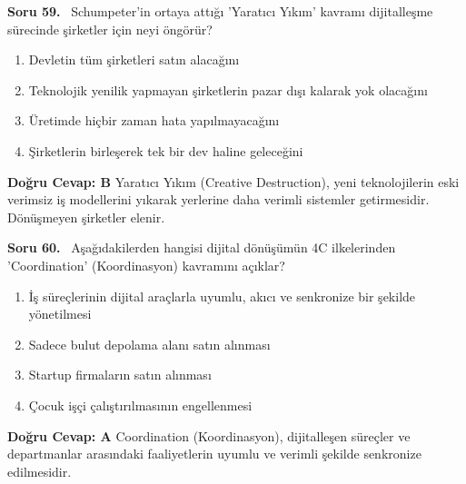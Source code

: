 \documentclass[11pt,a4paper,openany]{book}
\begin{document}
\needspace{5cm}
\vspace{8pt}
\noindent\textbf{\large\sffamily Soru 59.} \ Schumpeter'in ortaya attığı 'Yaratıcı Yıkım' kavramı dijitalleşme sürecinde şirketler için neyi öngörür?
\begin{enumerate}[label=\Alph*), leftmargin=25pt, topsep=4pt, itemsep=2pt]
    \item Devletin tüm şirketleri satın alacağını
    \item Teknolojik yenilik yapmayan şirketlerin pazar dışı kalarak yok olacağını
    \item Üretimde hiçbir zaman hata yapılmayacağını
    \item Şirketlerin birleşerek tek bir dev haline geleceğini
\end{enumerate}
\vspace{4pt}
\begin{tcolorbox}[title=Cevap ve Açıklama, colback=gray!3!white, colframe=primarycolor!90!black, arc=2mm, fonttitle=\bfseries\sffamily, top=6pt, bottom=6pt]
    \textbf{Doğru Cevap: B}
    \vspace{2pt}
    Yaratıcı Yıkım (Creative Destruction), yeni teknolojilerin eski verimsiz iş modellerini yıkarak yerlerine daha verimli sistemler getirmesidir. Dönüşmeyen şirketler elenir.
\end{tcolorbox}
\vspace{10pt}

\needspace{5cm}
\vspace{8pt}
\noindent\textbf{\large\sffamily Soru 60.} \ Aşağıdakilerden hangisi dijital dönüşümün 4C ilkelerinden 'Coordination' (Koordinasyon) kavramını açıklar?
\begin{enumerate}[label=\Alph*), leftmargin=25pt, topsep=4pt, itemsep=2pt]
    \item İş süreçlerinin dijital araçlarla uyumlu, akıcı ve senkronize bir şekilde yönetilmesi
    \item Sadece bulut depolama alanı satın alınması
    \item Startup firmaların satın alınması
    \item Çocuk işçi çalıştırılmasının engellenmesi
\end{enumerate}
\vspace{4pt}
\begin{tcolorbox}[title=Cevap ve Açıklama, colback=gray!3!white, colframe=primarycolor!90!black, arc=2mm, fonttitle=\bfseries\sffamily, top=6pt, bottom=6pt]
    \textbf{Doğru Cevap: A}
    \vspace{2pt}
    Coordination (Koordinasyon), dijitalleşen süreçler ve departmanlar arasındaki faaliyetlerin uyumlu ve verimli şekilde senkronize edilmesidir.
\end{tcolorbox}
\vspace{10pt}
\end{document}
